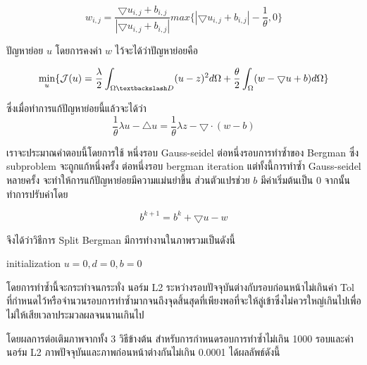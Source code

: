 \documentclass[hidelinks,a4paper,14pt]{article}
\numberwithin{equation}{section}							%
\begin{document}
{				$$ w_{i,j} = \frac{\bigtriangledown u_{i,j}  + b_{i,j} }{ | \bigtriangledown u_{i,j}  + b_{i,j} | } max \{  | \bigtriangledown u_{i,j}  + b_{i,j} | - \frac{1}{\theta} , 0\} $$
				
			ปัญหาย่อย $u$ โดยการคงค่า $w$ ไว้จะได้ว่าปัญหาย่อยคือ

				$$\min_{u} \{ \mathcal{J}(u) = \frac{\lambda}{2} \int_{\Omega \textbackslash D} (u-z)^2 d\Omega + \frac{\theta}{2} \int_{\Omega} (w - \bigtriangledown u + b) d\Omega \}$$
				
			ซึ่งเมื่อทำการแก้ปัญหาย่อยนี้แล้วจะได้ว่า
			$$ \frac{1}{\theta}\lambda u - \bigtriangleup u = \frac{1}{\theta} \lambda z - \bigtriangledown \cdot (w-b) $$
			
			เราจะประมาณคำตอบนี้โดยการใช้ หนึ่งรอบ Gauss-seidel ต่อหนึ่งรอบการทำซ้ำของ Bergman ซึ่ง subproblem จะถูกแก้หนึ่งครั้ง ต่อหนึ่งรอบ bergman iteration แต่ทั้งนี้การทำซ้ำ Gauss-seidel หลายครั้ง จะทำให้การแก้ปัญหาย่อยมีความแม่นยำขึ้น
			ส่วนตัวแปรช่วย $b$ มีค่าเริ่มต้นเป็น 0 จากนั้นทำการปรับค่าโดย
			
			$$ b^{k+1} = b^k  + \bigtriangledown u - w $$
						
			จึงได้ว่าวิธีการ Split Bergman มีการทำงานในภาพรวมเป็นดังนี้
			
			
			
			\begin{algorithm}[H]
				\begin{framed}
					initialization $u = 0, d = 0, b = 0$\\
				\end{framed}
			\end{algorithm}
			
			
			
			โดยการทำซ้ำนี้จะกระทำจนกระทั่ง นอร์ม L2 ระหว่างรอบปัจจุบันต่างกับรอบก่อนหน้าไม่เกินค่า Tol ที่กำหนดไว้หรือจำนวนรอบการทำซ้ำมากจนถึงจุดสิ้นสุดที่เพียงพอที่จะให้ลู่เข้าซึ่งไม่ควรใหญ่เกินไปเพื่อไม่ให้เสียเวลาประมวลผลจนนานเกินไป 

			โดยผลการต่อเติมภาพจากทั้ง 3 วิธีข้างต้น สำหรับการกำหนดรอบการทำซ้ำไม่เกิน 1000 รอบและค่านอร์ม L2 ภาพปัจจุบันและภาพก่อนหน้าต่างกันไม่เกิน 0.0001 ได้ผลลัพธ์ดังนี้
			
}
\end{document}
